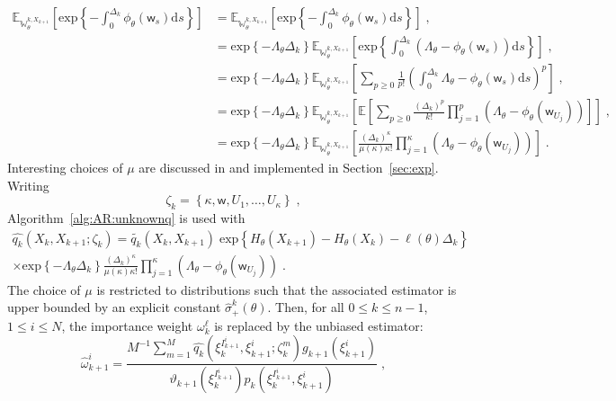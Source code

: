 \documentclass[12pt]{article}
\newcommand{\rmd}{\mathrm{d}}
\newcommand{\eqsp}{\;}
\newcommand{\1}{\mathrm{1}}
\newcommand{\qk}{q_{k}}
\newcommand{\mw}{\mathsf{w}}%
\begin{document}
\begin{align*}
\mathbb{E}_{\mathbb{W}_{\theta}^{k,X_{k+1}}}\left[\mathrm{exp}\left\{-\int_{0}^{\Delta_k}\phi_{\theta}(\mw_s)\rmd s\right\}\right] &= \mathbb{E}_{\mathbb{W}_{\theta}^{k,X_{k+1}}} \left[\mathrm{exp}\left\{-\int_{0}^{\Delta_k}\phi_{\theta}(\mw_s)\rmd s\right\}\right]\eqsp,\\
&= \mathrm{exp}\left\{-\Lambda_{\theta} \Delta_k\right\} \mathbb{E}_{\mathbb{W}_{\theta}^{k,X_{k+1}}} \left[\mathrm{exp}\left\{ \int_{0}^{\Delta_k}(\Lambda_{\theta}-\phi_{\theta}(\mw_s))\rmd s\right\}\right]\eqsp,\\
&=\mathrm{exp}\left\{-\Lambda_{\theta}\Delta_k\right\} \mathbb{E}_{\mathbb{W}_{\theta}^{k,X_{k+1}}}\left[\sum_{p\ge 0}\frac{1}{p!}\left(\int_{0}^{\Delta_k}\Lambda_{\theta}-\phi_{\theta}(\mw_s)\rmd s\right)^p\right]\eqsp,\\
&=\mathrm{exp}\left\{-\Lambda_{\theta}\Delta_k \right\} \mathbb{E}_{\mathbb{W}_{\theta}^{k,X_{k+1}}} \left[\mathbb{E}\left[\sum_{p\ge 0}\frac{( \Delta_k)^p}{k!} \prod_{j=1}^p\left(\Lambda_{\theta}-\phi_{\theta}(\mw_{U_j})\right)\right]\right]\eqsp,\\
&=\mathrm{exp}\left\{-\Lambda_{\theta} \Delta_k\right\} \mathbb{E}_{\mathbb{W}_{\theta}^{k,X_{k+1}}}\left[ \frac{(\Delta_k)^{\kappa}}{\mu(\kappa)\kappa!}\prod_{j=1}^{\kappa}\left(\Lambda_{\theta}-\phi_{\theta}(\mw_{U_j})\right)\right]\eqsp.
\end{align*}
Interesting choices of $\mu$ are discussed in \cite{beskos:papaspiliopoulos:roberts:fearnhead:2006} and implemented in Section~\ref{sec:exp}. Writing
\[
\zeta_k = \left\{\kappa,\mw,U_1,\ldots,U_\kappa\right\}\eqsp,
\]
Algorithm~\ref{alg:AR:unknownq} is used with 
\begin{multline}
\widehat{\qk}(X_{k},X_{k+1};\zeta_k) = \widetilde{\qk}(X_{k},X_{k+1}) \eqsp\mathrm{exp}\left\{H_{\theta}(X_{k+1}) - H_{\theta}(X_{k})-\ell(\theta) \Delta_k\right\}\\ 
\times\mathrm{exp}\left\{-\Lambda_{\theta}\Delta_k\right\}\frac{( \Delta_k)^{\kappa}}{\mu(\kappa)\kappa!}\prod_{j=1}^{\kappa}\left(\Lambda_{\theta}-\phi_{\theta}(\mw_{U_j})\right)\eqsp.\label{eq:unbiased:q}
\end{multline}
The choice of $\mu$ is restricted to distributions such that the associated estimator is upper bounded by an explicit constant $\hat{\sigma}_+^k(\theta)$. Then, for all $0\le k \le n-1$, $1\le i\le N$, the importance weight $\omega_k^{\ell}$ is replaced by the unbiased estimator:
\begin{equation}
\label{eq:random:weight}
\widehat{\omega}_{k+1}^{i} = \frac{M^{-1}\sum_{m=1}^M \widehat{\qk}(\xi_{k}^{I^{i}_{k+1}},\xi^{i}_{k+1};\zeta_k^m)g_{k+1}(\xi^{i}_{k+1})}{\vartheta_{k+1}(\xi^{I^{i}_{k+1}}_{k}) p_{k} (\xi_{k}^{I^{i}_{k+1}},\xi^{i}_{k+1})}\eqsp,
\end{equation}
\end{document}
